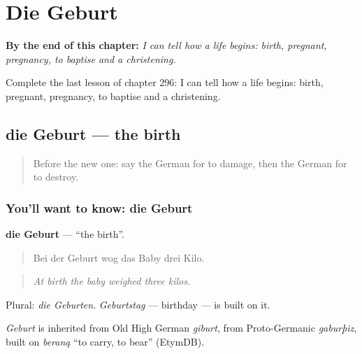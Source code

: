 
\chapter{Die Geburt}
\label{ch:ge-die-geburt}

\begin{chapteropening}
\textbf{By the end of this chapter:} \emph{I can tell how a life begins: birth, pregnant, pregnancy, to baptise and a christening.}

Complete the last lesson of chapter 296: I can tell how a life begins: birth, pregnant, pregnancy, to baptise and a christening.
\end{chapteropening}

\section[die Geburt]{die Geburt — the birth}

\label{lesson:GE-C296-geburt}



\begin{quote}
Before the new one: say the German for to damage, then the German for to destroy.
\end{quote}

\subsection*{You'll want to know: die Geburt}
\textbf{die Geburt} — \textquotedblleft{}the birth\textquotedblright{}.

\begin{quote}
Bei der Geburt wog das Baby drei Kilo.
\end{quote}

\begin{quote}
\emph{At birth the baby weighed three kilos.}
\end{quote}

Plural: \emph{die Geburten}. \emph{Geburtstag} — birthday — is built on it.

\begin{cousinweb}
\emph{Geburt} is inherited from Old High German \emph{giburt}, from Proto-Germanic \emph{gaburþiz}, built on \emph{beraną} \textquotedblleft{}to carry, to bear\textquotedblright{} (EtymDB).
\end{cousinweb}

